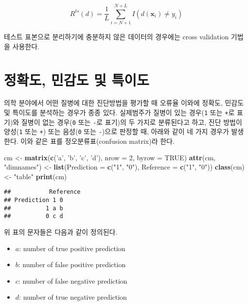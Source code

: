 \documentclass[]{book}
\newenvironment{Shaded}{\begin{snugshade}}{\end{snugshade}}
\newcommand{\DataTypeTok}[1]{\textcolor[rgb]{0.13,0.29,0.53}{#1}}
\newcommand{\DecValTok}[1]{\textcolor[rgb]{0.00,0.00,0.81}{#1}}
\newcommand{\KeywordTok}[1]{\textcolor[rgb]{0.13,0.29,0.53}{\textbf{#1}}}
\newcommand{\NormalTok}[1]{#1}
\newcommand{\OtherTok}[1]{\textcolor[rgb]{0.56,0.35,0.01}{#1}}
\newcommand{\StringTok}[1]{\textcolor[rgb]{0.31,0.60,0.02}{#1}}
\providecommand{\tightlist}{%
  \setlength{\itemsep}{0pt}\setlength{\parskip}{0pt}}
\begin{document}
\begin{equation}
R^{ts}(d) = \frac{1}{L} \sum_{i = N + 1}^{N + L} I(d(\mathbf{x}_i) \neq y_i)
\label{eq:misclassification-rate-test}
\end{equation}

테스트 표본으로 분리하기에 충분하지 않은 데이터의 경우에는 cross validation 기법을 사용한다.

\hypertarget{precision-sensitivity-specificity}{%
\section{정확도, 민감도 및 특이도}\label{precision-sensitivity-specificity}}

의학 분야에서 어떤 질병에 대한 진단방법을 평가할 때 오류율 이와에 정확도, 민감도 및 특이도를 분석하는 경우가 종종 있다. 실제범주가 질병이 있는 경우(\texttt{1} 또는 \texttt{+}로 표기)와 질병이 없는 경우(\texttt{0} 또는 \texttt{-}로 표기)의 두 가지로 분류된다고 하고, 진단 방법이 양성(\texttt{1} 또는 \texttt{+}) 또는 음성(\texttt{0} 또는 \texttt{-})으로 판정할 때, 아래와 같이 네 가지 경우가 발생한다. 이와 같은 표를 정오분류표(confusion matrix)라 한다.

\begin{Shaded}
\begin{Highlighting}[]
\NormalTok{cm <-}\StringTok{ }\KeywordTok{matrix}\NormalTok{(}\KeywordTok{c}\NormalTok{(}\StringTok{'a'}\NormalTok{, }\StringTok{'b'}\NormalTok{, }\StringTok{'c'}\NormalTok{, }\StringTok{'d'}\NormalTok{), }\DataTypeTok{nrow =} \DecValTok{2}\NormalTok{, }\DataTypeTok{byrow =} \OtherTok{TRUE}\NormalTok{)}
\KeywordTok{attr}\NormalTok{(cm, }\StringTok{"dimnames"}\NormalTok{) <-}\StringTok{ }\KeywordTok{list}\NormalTok{(}\DataTypeTok{Prediction =} \KeywordTok{c}\NormalTok{(}\StringTok{"1"}\NormalTok{, }\StringTok{"0"}\NormalTok{), }\DataTypeTok{Reference =} \KeywordTok{c}\NormalTok{(}\StringTok{"1"}\NormalTok{, }\StringTok{"0"}\NormalTok{))}
\KeywordTok{class}\NormalTok{(cm) <-}\StringTok{ "table"}
\KeywordTok{print}\NormalTok{(cm)}
\end{Highlighting}
\end{Shaded}

\begin{verbatim}
##           Reference
## Prediction 1 0
##          1 a b
##          0 c d
\end{verbatim}

위 표의 문자들은 다음과 같이 정의된다.

\begin{itemize}
\tightlist
\item
  \(a\): number of true positive prediction
\item
  \(b\): number of false positive prediction
\item
  \(c\): number of false negative prediction
\item
  \(d\): number of true negative prediction
\end{itemize}
\end{document}
